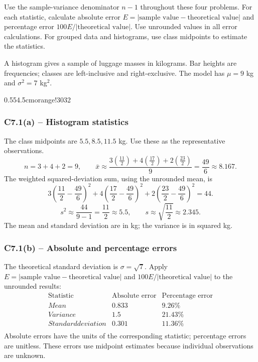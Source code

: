 Use the sample-variance denominator $n-1$ throughout these four problems.
For each statistic, calculate absolute error $E=|\text{sample value}-\text{theoretical value}|$
and percentage error $100E/|\text{theoretical value}|$. Use unrounded values in all error calculations.
For grouped data and histograms, use class midpoints to estimate the statistics.

{
A histogram gives a sample of luggage masses in kilograms. Bar heights are
frequencies; classes are left-inclusive and right-exclusive.
The model has $\mu=9$ kg and $\sigma^2=7$ kg$^2$.
\begin{center}
{0.55\textwidth}{4.5cm}{orange!30}{3}{2}
\end{center}
\label{sol:c7-1a}
\subsubsection*{C7.1(a) -- Histogram statistics }
The class midpoints are $5.5,8.5,11.5$ kg. Use these as the representative observations.
\[
n=3+4+2=9,\qquad
\bar{x}\approx\frac{3(\frac{11}{2})+4(\frac{17}{2})+2(\frac{23}{2})}{9}=\frac{49}{6}\approx8.167.
\]
The weighted squared-deviation sum, using the unrounded mean, is
\[
3\left(\frac{11}{2}-\frac{49}{6}\right)^2+4\left(\frac{17}{2}-\frac{49}{6}\right)^2+2\left(\frac{23}{2}-\frac{49}{6}\right)^2=44.
\]
\[
s^2\approx\frac{44}{9-1}=\frac{11}{2}\approx5.5,\qquad
s\approx\sqrt{\frac{11}{2}}\approx2.345.
\]
The mean and standard deviation are in kg; the variance is in squared kg.

\label{sol:c7-1b}
\subsubsection*{C7.1(b) -- Absolute and percentage errors }
The theoretical standard deviation is $\sigma=\sqrt{7}$.
Apply $E=|\text{sample value}-\text{theoretical value}|$ and
$100E/|\text{theoretical value}|$ to the unrounded results:
\[
\begin{array}{l|rr}
\text{Statistic}&\text{Absolute error}&\text{Percentage error}\\\hline
Mean&0.833&9.26\%\\
Variance&1.5\phantom{00}&21.43\%\\
Standard deviation&0.301&11.36\%\\
\end{array}
\]
Absolute errors have the units of the corresponding statistic; percentage errors are unitless.
These errors use midpoint estimates because individual observations are unknown.
\secInicio[sec:c7-1]

}

